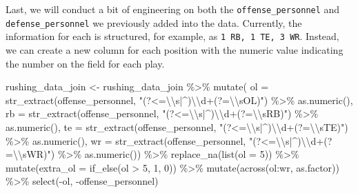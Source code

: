 \documentclass[
  letterpaper,
]{krantz}
\newenvironment{Shaded}{\begin{snugshade}}{\end{snugshade}}
\newcommand{\AttributeTok}[1]{\textcolor[rgb]{0.40,0.45,0.13}{#1}}
\newcommand{\DecValTok}[1]{\textcolor[rgb]{0.68,0.00,0.00}{#1}}
\newcommand{\FunctionTok}[1]{\textcolor[rgb]{0.28,0.35,0.67}{#1}}
\newcommand{\NormalTok}[1]{\textcolor[rgb]{0.00,0.23,0.31}{#1}}
\newcommand{\OtherTok}[1]{\textcolor[rgb]{0.00,0.23,0.31}{#1}}
\newcommand{\SpecialCharTok}[1]{\textcolor[rgb]{0.37,0.37,0.37}{#1}}
\newcommand{\StringTok}[1]{\textcolor[rgb]{0.13,0.47,0.30}{#1}}
\begin{document}
Last, we will conduct a bit of engineering on both the
\texttt{offense\_personnel} and \texttt{defense\_personnel} we
previously added into the data. Currently, the information for each is
structured, for example, as \texttt{1\ RB,\ 1\ TE,\ 3\ WR}. Instead, we
can create a new column for each position with the numeric value
indicating the number on the field for each play.

\begin{Shaded}
\begin{Highlighting}[]
\NormalTok{rushing\_data\_join }\OtherTok{\textless{}{-}}\NormalTok{ rushing\_data\_join }\SpecialCharTok{\%\textgreater{}\%}
  \FunctionTok{mutate}\NormalTok{(}
    \AttributeTok{ol =} \FunctionTok{str\_extract}\NormalTok{(offense\_personnel,}
                     \StringTok{"(?\textless{}=}\SpecialCharTok{\textbackslash{}\textbackslash{}}\StringTok{s|\^{})}\SpecialCharTok{\textbackslash{}\textbackslash{}}\StringTok{d+(?=}\SpecialCharTok{\textbackslash{}\textbackslash{}}\StringTok{sOL)"}\NormalTok{) }\SpecialCharTok{\%\textgreater{}\%} \FunctionTok{as.numeric}\NormalTok{(),}
    \AttributeTok{rb =} \FunctionTok{str\_extract}\NormalTok{(offense\_personnel,}
                     \StringTok{"(?\textless{}=}\SpecialCharTok{\textbackslash{}\textbackslash{}}\StringTok{s|\^{})}\SpecialCharTok{\textbackslash{}\textbackslash{}}\StringTok{d+(?=}\SpecialCharTok{\textbackslash{}\textbackslash{}}\StringTok{sRB)"}\NormalTok{) }\SpecialCharTok{\%\textgreater{}\%} \FunctionTok{as.numeric}\NormalTok{(),}
    \AttributeTok{te =} \FunctionTok{str\_extract}\NormalTok{(offense\_personnel,}
                     \StringTok{"(?\textless{}=}\SpecialCharTok{\textbackslash{}\textbackslash{}}\StringTok{s|\^{})}\SpecialCharTok{\textbackslash{}\textbackslash{}}\StringTok{d+(?=}\SpecialCharTok{\textbackslash{}\textbackslash{}}\StringTok{sTE)"}\NormalTok{) }\SpecialCharTok{\%\textgreater{}\%} \FunctionTok{as.numeric}\NormalTok{(),}
    \AttributeTok{wr =} \FunctionTok{str\_extract}\NormalTok{(offense\_personnel,}
                     \StringTok{"(?\textless{}=}\SpecialCharTok{\textbackslash{}\textbackslash{}}\StringTok{s|\^{})}\SpecialCharTok{\textbackslash{}\textbackslash{}}\StringTok{d+(?=}\SpecialCharTok{\textbackslash{}\textbackslash{}}\StringTok{sWR)"}\NormalTok{) }\SpecialCharTok{\%\textgreater{}\%} \FunctionTok{as.numeric}\NormalTok{()) }\SpecialCharTok{\%\textgreater{}\%}
  \FunctionTok{replace\_na}\NormalTok{(}\FunctionTok{list}\NormalTok{(}\AttributeTok{ol =} \DecValTok{5}\NormalTok{)) }\SpecialCharTok{\%\textgreater{}\%}
  \FunctionTok{mutate}\NormalTok{(}\AttributeTok{extra\_ol =} \FunctionTok{if\_else}\NormalTok{(ol }\SpecialCharTok{\textgreater{}} \DecValTok{5}\NormalTok{, }\DecValTok{1}\NormalTok{, }\DecValTok{0}\NormalTok{)) }\SpecialCharTok{\%\textgreater{}\%}
  \FunctionTok{mutate}\NormalTok{(}\FunctionTok{across}\NormalTok{(ol}\SpecialCharTok{:}\NormalTok{wr, as.factor)) }\SpecialCharTok{\%\textgreater{}\%}
  \FunctionTok{select}\NormalTok{(}\SpecialCharTok{{-}}\NormalTok{ol, }\SpecialCharTok{{-}}\NormalTok{offense\_personnel)}


\end{Highlighting}
\end{Shaded}
\end{document}
